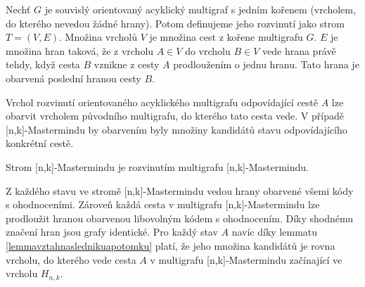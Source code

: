 \begin{definice}
    Nechť $G$ je souvislý orientovaný acyklický multigraf s jedním kořenem (vrcholem, do kterého nevedou žádné hrany). 
    Potom definujeme jeho rozvinutí jako strom $T = (V, E)$.
    Množina vrcholů $V$ je množina cest z kořene multigrafu $G$.
    $E$ je množina hran taková, že z vrcholu $A \in V$ do vrcholu $B \in V$ vede hrana právě tehdy, když cesta $B$ vznikne z cesty $A$ prodloužením o jednu hranu. Tato hrana je obarvená poslední hranou cesty $B$. 
\end{definice}
\begin{pozn}\label{poznobarvenivrcholurozvinuti}
    Vrchol rozvinutí orientovaného acyklického multigrafu odpovídající cestě $A$ lze obarvit vrcholem původního multigrafu, do kterého tato cesta vede. V případě [n,k]-Mastermindu by obarvením byly množiny kandidátů stavu odpovídajícího konkrétní cestě. 
\end{pozn}


\begin{veta}
    Strom [n,k]-Mastermindu je rozvinutím multigrafu [n,k]-Mastermindu.
\end{veta}
\begin{dukaz}
    Z každého stavu ve stromě [n,k]-Mastermindu vedou hrany obarvené všemi kódy s ohodnoceními. Zároveň každá cesta v multigrafu [n,k]-Mastermindu lze prodloužit hranou obarvenou libovolným kódem s ohodnocením. Díky shodnému značení hran jsou grafy identické. Pro každý stav $A$ navíc díky lemmatu \ref{lemmavztahnaslednikuapotomku} platí, že jeho množina kandidátů je rovna vrcholu, do kterého vede cesta $A$ v multigrafu [n,k]-Mastermindu začínající ve vrcholu $H_{n,k}$. 



\end{dukaz}





